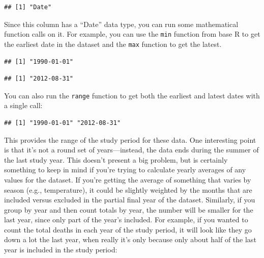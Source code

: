 \documentclass[
]{book}
\newenvironment{Shaded}{\begin{snugshade}}{\end{snugshade}}
\newcommand{\KeywordTok}[1]{\textcolor[rgb]{0.13,0.29,0.53}{\textbf{#1}}}
\newcommand{\NormalTok}[1]{#1}
\newcommand{\OperatorTok}[1]{\textcolor[rgb]{0.81,0.36,0.00}{\textbf{#1}}}
\begin{document}
\begin{verbatim}
## [1] "Date"
\end{verbatim}

Since this column has a ``Date'' data type, you can run some mathematical function
calls on it. For example, you can use the \texttt{min} function from base R to get the
earliest date in the dataset and the \texttt{max} function to get the latest.

\begin{Shaded}
\end{Shaded}

\begin{verbatim}
## [1] "1990-01-01"
\end{verbatim}

\begin{Shaded}
\end{Shaded}

\begin{verbatim}
## [1] "2012-08-31"
\end{verbatim}

You can also run the \texttt{range} function to get both the earliest and latest dates
with a single call:

\begin{Shaded}
\end{Shaded}

\begin{verbatim}
## [1] "1990-01-01" "2012-08-31"
\end{verbatim}

This provides the range of the study period for these data. One interesting point
is that it's not a round set of years---instead, the data ends during the summer
of the last study year. This doesn't present a big problem, but is certainly
something to keep in mind if you're trying to calculate yearly averages of
any values for the dataset. If you're getting the average of something that varies
by season (e.g., temperature), it could be slightly weighted by the months that
are included versus excluded in the partial final year of the dataset. Similarly,
if you group by year and then count totals by year, the number will be smaller
for the last year, since only part of the year's included. For example, if you
wanted to count the total deaths in each year of the study period, it will look
like they go down a lot the last year, when really it's only because only about half
of the last year is included in the study period:
\end{document}

